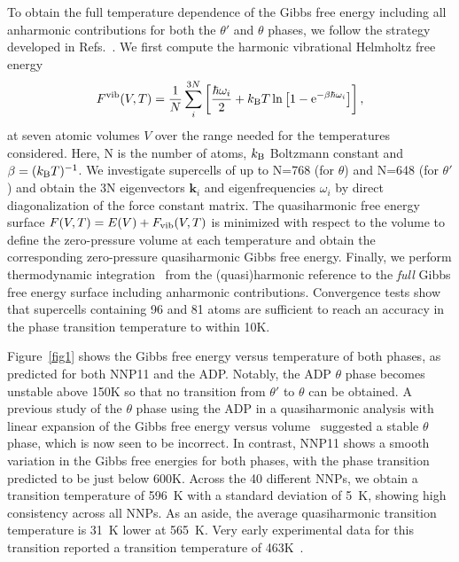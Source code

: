 \documentclass{article}
\begin{document}
To obtain the full temperature dependence of the 
Gibbs free energy including all anharmonic contributions for both the $\theta'$ and $\theta$ phases, we follow the strategy developed in Refs.~\cite{Grabowski2007,Grabowski2009,Glensk2014}.  We first compute the harmonic vibrational Helmholtz free energy 
\begin{equation}
     F^{\rm vib}(V,T) = \frac{1}{N} \sum_{i}^{3N} \left[\frac{\hbar\omega_{i}}{2} + k_{\rm B} T \ln\left[1-\mathrm{e}^{- \beta \hbar\omega_{i}}\right]\right],
 \label{Fqh3}
\end{equation}
at seven atomic volumes $V$ over the range needed for the temperatures considered. Here, N is the number of atoms, $k_{\rm B}$ Boltzmann constant and $\beta=(k_{\rm B}T)^{-1}$. We investigate supercells of up to N=768 (for $\theta$) and N=648 (for $\theta'$) and obtain the 3N eigenvectors $\mathbf{k}_i$ and eigenfrequencies $\omega_{i}$ by direct diagonalization of the force constant matrix. The quasiharmonic free energy surface $F(V,T)=E(V)+F_{\rm vib}(V,T)$ is minimized with respect to the volume to define the zero-pressure volume at each temperature and obtain the corresponding zero-pressure quasiharmonic Gibbs free energy.
Finally, we perform thermodynamic integration~\cite{Grabowski2009,Glensk2015} from the (quasi)harmonic reference to the \textit{full} Gibbs free energy surface including anharmonic contributions. Convergence tests show that supercells containing 96 and 81 atoms are sufficient to reach an accuracy in the phase transition temperature to within 10K. 

Figure~\ref{fig1} shows the Gibbs free energy versus temperature of both phases, as predicted for both NNP11 and the ADP. Notably, the ADP $\theta$ phase becomes unstable above 150K so that no transition from $\theta'$ to $\theta$ can be obtained.  A previous study of the $\theta$ phase using the ADP in a quasiharmonic analysis with linear expansion of the Gibbs free energy versus volume~\cite{Apostol2011} suggested a stable $\theta$ phase, which is now seen to be incorrect.  In contrast, NNP11 shows a smooth variation in the Gibbs free energies for both phases, with the phase transition predicted to be just below 600K.  Across the 40 different NNPs, we obtain a transition temperature of 596~K with a standard deviation of 5~K, showing high consistency across all NNPs.  As an aside, the average quasiharmonic transition temperature is 31~K lower at 565~K. Very early experimental data for this transition reported a transition temperature of 463K~\cite{J.M.SilcockT.J.Heal1953}.
\end{document}
